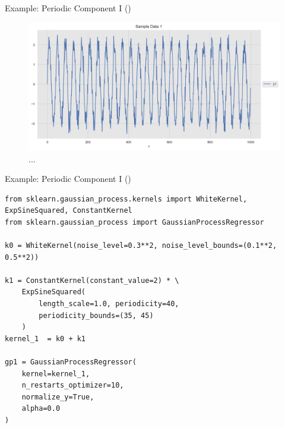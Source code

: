 \documentclass[10pt]{beamer}
\begin{document}
\begin{frame}{Example: Periodic Component I (\cite{gaussian_process_time_series_2019})}{\cite[Section 1.7. Gaussian Processes]{scikitlearn}}
\begin{center}
\begin{figure}
\includegraphics[scale=0.4]{images/gaussian_process_time_series_files/gaussian_process_time_series_13_0.png} 
\caption{ ...  }
\end{figure}
\end{center}
\end{frame}

\begin{frame}[fragile]{Example: Periodic Component I (\cite{gaussian_process_time_series_2019})}{\cite[Section 1.7. Gaussian Processes]{scikitlearn}}
\begin{lstlisting}
from sklearn.gaussian_process.kernels import WhiteKernel, ExpSineSquared, ConstantKernel
from sklearn.gaussian_process import GaussianProcessRegressor

k0 = WhiteKernel(noise_level=0.3**2, noise_level_bounds=(0.1**2, 0.5**2))

k1 = ConstantKernel(constant_value=2) * \ 
    ExpSineSquared(
        length_scale=1.0, periodicity=40, 
        periodicity_bounds=(35, 45)
    )
kernel_1  = k0 + k1 

gp1 = GaussianProcessRegressor(
    kernel=kernel_1, 
    n_restarts_optimizer=10, 
    normalize_y=True,
    alpha=0.0
)
\end{lstlisting}
\end{frame}
\end{document}
